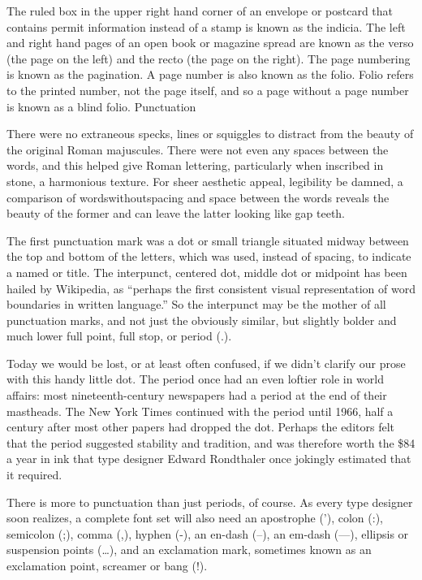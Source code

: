 \documentclass[12pt,a4paper,twocolumn]{book} %
\begin{document}
The ruled box in the upper right hand corner of an envelope or postcard that contains permit information instead of a stamp is known as the indicia. The left and right hand pages of an open book or magazine spread are known as the verso (the page on the left) and the recto (the page on the right).
The page numbering is known as the pagination. A page number is also known as the folio. Folio refers to the printed number, not the page itself, and so a page without a page number is known as a blind folio.
Punctuation

There were no extraneous specks, lines or squiggles to distract from the beauty of the original Roman majuscules. There were not even any spaces between the words, and this helped give Roman lettering, particularly when inscribed in stone, a harmonious texture. For sheer aesthetic appeal, legibility be damned, a comparison of wordswithoutspacing and space between the words reveals the beauty of the former and can leave the latter looking like gap teeth.

The first punctuation mark was a dot or small triangle situated midway between the top and bottom of the letters, which was used, instead of spacing, to indicate a named or title. The interpunct, centered dot, middle dot or midpoint has been hailed by Wikipedia, as “perhaps the first consistent visual representation of word boundaries in written language.” So the interpunct may be the mother of all punctuation marks, and not just the obviously similar, but slightly bolder and much lower full point, full stop, or period (.).

Today we would be lost, or at least often confused, if we didn’t clarify our prose with this handy little dot. The period once had an even loftier role in world affairs: most nineteenth-century newspapers had a period at the end of their mastheads. The New York Times continued with the period until 1966, half a century after most other papers had dropped the dot. Perhaps the editors felt that the period suggested stability and tradition, and was therefore worth the \$84 a year in ink that type designer Edward Rondthaler once jokingly estimated that it required.

There is more to punctuation than just periods, of course. As every type designer soon realizes, a complete font set will also need an apostrophe (’), colon (:), semicolon (;), comma (,), hyphen (-), an en-dash (–), an em-dash (—), ellipsis or suspension points (…), and an exclamation mark, sometimes known as an exclamation point, screamer or bang (!).
\end{document}
